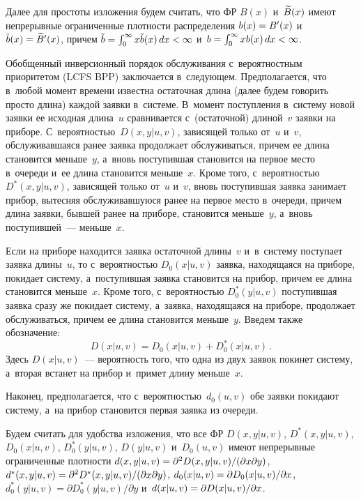 \begin{multicols}{2}
Далее для простоты изложения будем считать, что ФР $B(x)$ и~$\widetilde B(x)$ имеют непрерывные
ограниченные плотности распределения $b(x)\hm=B'(x)$ и~$\tb(x)\hm=\tB'(x)$,
причем $\tb \hm= \int_0^\infty x \tb(x)\,dx \hm< \infty$
и~$b \hm= \int_0^\infty x b(x)\,dx \hm< \infty$.

Обобщенный инверсионный порядок обслуживания с~вероятностным приоритетом (LCFS BPP)
заключается в~следующем.
Предполагается, что в~любой момент времени известна остаточная длина (далее будем говорить
просто длина) каждой заявки в~системе.
В~момент поступления в~систему новой заявки ее
исходная длина~$u$ сравнивается с~(остаточной) длиной~$v$ заявки на приборе.
С~вероятностью~$D(x,y|u,v)$,
зависящей только от~$u$ и~$v$, обслуживавшаяся ранее заявка продолжает обслуживаться, причем
ее длина становится меньше~$y$, а~вновь
поступившая становится на первое место в~очереди и~ее длина становится меньше~$x$.
Кроме того, с~вероятностью~$D^*(x,y|u,v)$,
зависящей только от~$u$ и~$v$, вновь поступившая заявка занимает прибор, вытесняя обслуживавшуюся
ранее на первое место в~очереди, причем длина заявки, бывшей ранее на приборе, становится
меньше~$y$, а~вновь поступившей~--- меньше~$x$.

Если на приборе находится заявка остаточной длины~$v$ и~в~систему поступает заявка
длины~$u$, то с~вероятностью $D_0(x|u,v)$ заявка, находящаяся на приборе, покидает
систему, а~поступившая заявка становится на
прибор, причем ее длина становится меньше~$x$.
Кроме того, с~вероятностью
$D_0^*(y|u,v)$ поступившая заявка сразу же покидает систему, а~заявка, находящаяся на
приборе, продолжает обслуживаться, причем ее длина становится меньше~$y$.
Введем также обозначение:
\begin{equation*}
D(x|u,v) = D_0(x|u,v) + D_0^*(x|u,v)\,.
\end{equation*}
Здесь $D(x|u,v)$~--- вероятность того, что одна из двух заявок покинет систему, а~вторая встанет
на прибор и~примет длину меньше~$x$.

Наконец, предполагается, что с~вероят\-ностью~$d_0(u,v)$ обе заявки покидают
систему, а~на прибор становится первая заявка из очереди.

Будем считать для удобства изложения, что все ФР 
$D(x,y|u,v)$, $D^*(x,y|u,v)$, $D_0(x|u,v)$,
$D_0^*(y|u,v)$, $D(y|u,v)$ и~$D_0(u,v)$
имеют непрерывные ограниченные плотности
$d(x,y|u,v)\hm=\partial^2 D(x,y|u,v)/(\partial x \partial y)$,
$d^*(x,y|u,v)\hm=\partial^2 D^*(x,y|u,v)/(\partial x \partial y)$,
$d_0(x|u,v)\hm= \partial D_0(x|u,v)/\partial x$,
$d_0^*(y|u,v)=\partial D_0^*(y|u,v)/\partial y$
и~$d(x|u,v)\hm=\partial D(x|u,v)/\partial x$.



\end{multicols}
